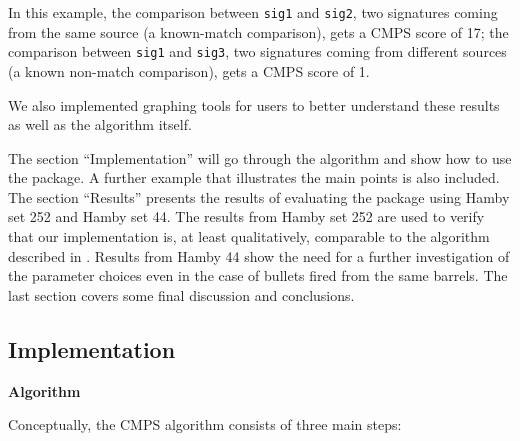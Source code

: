 In this example, the comparison between \texttt{sig1} and \texttt{sig2},
two signatures coming from the same source (a known-match comparison),
gets a CMPS score of 17; the comparison between \texttt{sig1} and
\texttt{sig3}, two signatures coming from different sources (a known
non-match comparison), gets a CMPS score of 1.

We also implemented graphing tools for users to better understand these
results as well as the algorithm itself.

The section ``Implementation'' will go through the algorithm and show
how to use the  package. A further example that illustrates
the main points is also included. The section ``Results'' presents the
results of evaluating the  package using Hamby set 252 and
Hamby set 44. The results from Hamby set 252 are used to verify that our
implementation is, at least qualitatively, comparable to the algorithm
described in \citet{cmps}. Results from Hamby 44 show the need for a
further investigation of the parameter choices even in the case of
bullets fired from the same barrels.
The last section covers some final discussion and conclusions.

\hypertarget{implementation}{%
\subsection{Implementation}\label{implementation}}

\textbf{Algorithm}

Conceptually, the CMPS algorithm consists of three main steps:

